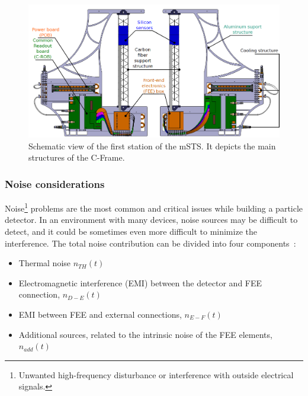 \begin{figure}[!h]
\centering
\includegraphics[width=0.9\columnwidth]{Chapter6/DCS/images/unit0.png}
\caption{Schematic view of the first station of the \gls{mSTS}. It depicts the main structures of the C-Frame. }
\label{fig_msts_scheme}
\end{figure}
\newpage


\subsubsection{Noise considerations}
Noise\footnote{Unwanted high-frequency disturbance or interference with outside electrical signals.} problems are the most common and critical issues while building a particle detector. In an environment with many devices, noise sources may be difficult to detect, and it could be sometimes even more difficult to minimize the interference. The total noise contribution can be divided into four components~\cite{noise_twepp2008}:
\begin{itemize}
    \item Thermal noise $n_{TH}(t)$
    \item Electromagnetic interference (\gls{EMI}) between the detector and \gls{FEE} connection, $n_{D-E}(t)$
    \item \gls{EMI} between \gls{FEE} and external connections, $n_{E-F}(t)$
    \item Additional sources, related to the intrinsic noise of the FEE elements, $n_{add}(t)$
\end{itemize}

